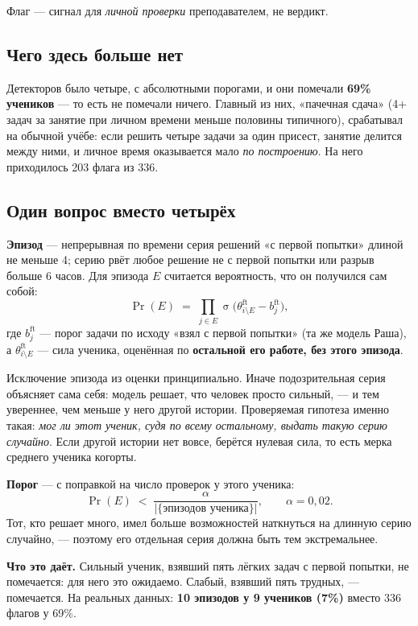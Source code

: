 \documentclass[11pt,a4paper]{article}
\newcommand{\sig}{\operatorname{\sigma}}
\begin{document}
Флаг --- сигнал для \emph{личной проверки} преподавателем, не вердикт.

\subsection*{Чего здесь больше нет}

Детекторов было четыре, с абсолютными порогами, и они помечали \textbf{69\%
учеников} --- то есть не помечали ничего. Главный из них, «пачечная сдача»
(4+ задач за занятие при личном времени меньше половины типичного), срабатывал
на обычной учёбе: если решить четыре задачи за один присест, занятие делится
между ними, и личное время оказывается мало \emph{по построению}. На него
приходилось 203 флага из 336.

\subsection*{Один вопрос вместо четырёх}

\textbf{Эпизод} --- непрерывная по времени серия решений «с первой попытки»
длиной не меньше 4; серию рвёт любое решение не с первой попытки или разрыв
больше 6 часов. Для эпизода $E$ считается вероятность, что он получился сам
собой:
\[
  \Pr(E) \;=\; \prod_{j \in E} \sig\bigl(\theta^{\text{ft}}_{i \setminus E} - b^{\text{ft}}_j\bigr),
\]
где $b^{\text{ft}}_j$ --- порог задачи по исходу «взял с первой попытки»
(та же модель Раша), а $\theta^{\text{ft}}_{i \setminus E}$ --- сила ученика,
оценённая по \textbf{остальной его работе, без этого эпизода}.

Исключение эпизода из оценки принципиально. Иначе подозрительная серия
объясняет сама себя: модель решает, что человек просто сильный, --- и тем
увереннее, чем меньше у него другой истории. Проверяемая гипотеза именно такая:
\emph{мог ли этот ученик, судя по всему остальному, выдать такую серию
случайно}. Если другой истории нет вовсе, берётся нулевая сила, то есть мерка
среднего ученика когорты.

\textbf{Порог} --- с поправкой на число проверок у этого ученика:
\[
  \Pr(E) \;<\; \frac{\alpha}{|\{\text{эпизодов ученика}\}|},
  \qquad \alpha = 0{,}02 .
\]
Тот, кто решает много, имел больше возможностей наткнуться на длинную серию
случайно, --- поэтому его отдельная серия должна быть тем экстремальнее.

\textbf{Что это даёт.} Сильный ученик, взявший пять лёгких задач с первой
попытки, не помечается: для него это ожидаемо. Слабый, взявший пять трудных, ---
помечается. На реальных данных: \textbf{10 эпизодов у 9 учеников (7\%)} вместо
336 флагов у 69\%.
\end{document}
